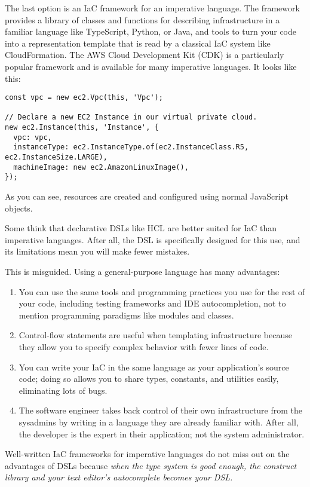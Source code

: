 \documentclass{article}
\begin{document}
The last option is an IaC framework for an imperative language.
The framework provides a library of classes and functions for describing infrastructure in a familiar language like TypeScript, Python, or Java, and tools to turn your code into a representation template that is read by a classical IaC system like CloudFormation.
The AWS Cloud Development Kit (CDK) is a particularly popular framework and is available for many imperative languages.
It looks like this:

\begin{verbatim}
const vpc = new ec2.Vpc(this, 'Vpc');

// Declare a new EC2 Instance in our virtual private cloud.
new ec2.Instance(this, 'Instance', {
  vpc: vpc,
  instanceType: ec2.InstanceType.of(ec2.InstanceClass.R5, ec2.InstanceSize.LARGE),
  machineImage: new ec2.AmazonLinuxImage(),
});
\end{verbatim}

As you can see, resources are created and configured using normal JavaScript objects.

Some think that declarative DSLs like HCL are better suited for IaC than imperative languages.
After all, the DSL is specifically designed for this use, and its limitations mean you will make fewer mistakes.

This is misguided.
Using a general-purpose language has many advantages:

\begin{enumerate}
  \item You can use the same tools and programming practices you use for the rest of your code, including testing frameworks and IDE autocompletion, not to mention programming paradigms like modules and classes.
  \item Control-flow statements are useful when templating infrastructure because they allow you to specify complex behavior with fewer lines of code.
  \item You can write your IaC in the same language as your application's source code; doing so allows you to share types, constants, and utilities easily, eliminating lots of bugs.
  \item The software engineer takes back control of their own infrastructure from the sysadmins by writing in a language they are already familiar with.
    After all, the developer is the expert in their application; not the system administrator.
\end{enumerate}

Well-written IaC frameworks for imperative languages do not miss out on the advantages of DSLs because \textit{when the type system is good enough, the construct library and your text editor's autocomplete becomes your DSL.}
\end{document}
